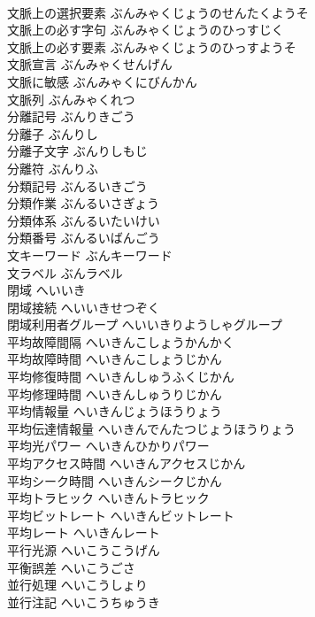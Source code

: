 \documentclass[8pt]{extreport}
\begin{document}
\begin{CJK}{UTF8}{min}
\\	文脈上の選択要素	ぶんみゃくじょうのせんたくようそ	
\\	文脈上の必す字句	ぶんみゃくじょうのひっすじく	
\\	文脈上の必す要素	ぶんみゃくじょうのひっすようそ	
\\	文脈宣言	ぶんみゃくせんげん	
\\	文脈に敏感	ぶんみゃくにびんかん	
\\	文脈列	ぶんみゃくれつ	
\\	分離記号	ぶんりきごう	
\\	分離子	ぶんりし	
\\	分離子文字	ぶんりしもじ	
\\	分離符	ぶんりふ	
\\	分類記号	ぶんるいきごう	
\\	分類作業	ぶんるいさぎょう	
\\	分類体系	ぶんるいたいけい	
\\	分類番号	ぶんるいばんごう	
\\	文キーワード	ぶんキーワード	
\\	文ラベル	ぶんラベル	
\\	閉域	へいいき	
\\	閉域接続	へいいきせつぞく	
\\	閉域利用者グループ	へいいきりようしゃグループ	
\\	平均故障間隔	へいきんこしょうかんかく	
\\	平均故障時間	へいきんこしょうじかん	
\\	平均修復時間	へいきんしゅうふくじかん	
\\	平均修理時間	へいきんしゅうりじかん	
\\	平均情報量	へいきんじょうほうりょう	
\\	平均伝達情報量	へいきんでんたつじょうほうりょう	
\\	平均光パワー	へいきんひかりパワー	
\\	平均アクセス時間	へいきんアクセスじかん	
\\	平均シーク時間	へいきんシークじかん	
\\	平均トラヒック	へいきんトラヒック	
\\	平均ビットレート	へいきんビットレート	
\\	平均レート	へいきんレート	
\\	平行光源	へいこうこうげん	
\\	平衡誤差	へいこうごさ	
\\	並行処理	へいこうしょり	
\\	並行注記	へいこうちゅうき	

\end{CJK}
\end{document}
